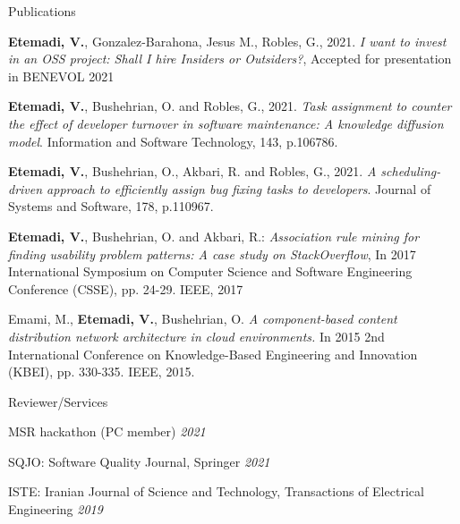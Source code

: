 \documentclass{resume} %
\begin{document}
\begin{rSection}{Publications}

\item \textbf{Etemadi, V.}, Gonzalez-Barahona, Jesus M., Robles, G., 2021. \emph{I want to invest in an OSS project: Shall I hire Insiders or Outsiders?}, Accepted for presentation in BENEVOL 2021
\item \textbf{Etemadi, V.}, Bushehrian, O. and Robles, G., 2021. \emph{Task assignment to counter the effect of developer turnover in software maintenance: A knowledge diffusion model}. Information and Software Technology, 143, p.106786.
\item \textbf{Etemadi, V.}, Bushehrian, O., Akbari, R. and Robles, G., 2021. \emph{A scheduling-driven approach to efficiently assign bug fixing tasks to developers}. Journal of Systems and Software, 178, p.110967.
\item \textbf{Etemadi, V.}, Bushehrian, O. and Akbari, R.:  \textit{Association rule mining for finding usability problem patterns: A case study on StackOverflow}, In 2017 International Symposium on Computer Science and Software Engineering Conference (CSSE), pp. 24-29. IEEE, 2017
\item Emami, M., \textbf{Etemadi, V.}, Bushehrian, O. \textit{A component-based content distribution network architecture in cloud environments.} In 2015 2nd International Conference on Knowledge-Based Engineering and Innovation (KBEI), pp. 330-335. IEEE, 2015.\\

\end{rSection}



\begin{rSection}{Reviewer/Services}
\item MSR hackathon (PC member) \hfill {\em  2021}
\item SQJO: Software Quality Journal, Springer \hfill {\em  2021}
\item ISTE: Iranian Journal of Science and Technology, Transactions of Electrical Engineering \hfill {\em  2019} 
\end{rSection}
\end{document}
